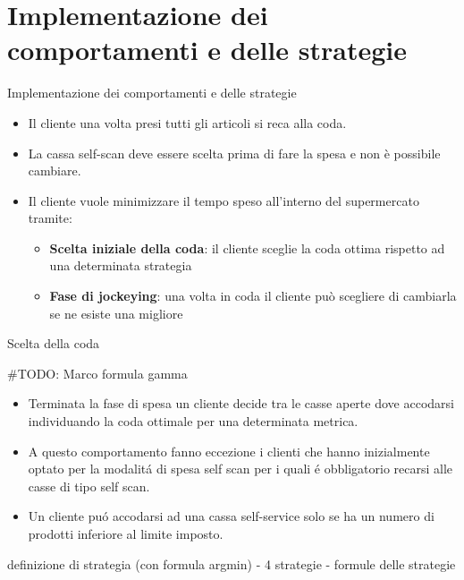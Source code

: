 \section{Implementazione dei comportamenti e delle strategie}





\begin{frame}{Implementazione dei comportamenti e delle strategie}
	\begin{itemize}
		\item Il cliente una volta presi tutti gli articoli si reca alla coda.
		\item La cassa self-scan deve essere scelta prima di fare la spesa e non è possibile cambiare.
		\item Il cliente vuole minimizzare il tempo speso all'interno del supermercato tramite:
		\begin{itemize}
			\item \textbf{Scelta iniziale della coda}: il cliente sceglie la coda ottima rispetto ad una determinata strategia
			\item \textbf{Fase di jockeying}: una volta in coda il cliente può scegliere di cambiarla se ne esiste una migliore
		\end{itemize}
	\end{itemize}
\end{frame}


\begin{frame}{Scelta della coda}
  \centering

  \#TODO: Marco formula gamma

  \begin{itemize}
  \item Terminata la fase di spesa un cliente decide tra le casse
    aperte dove accodarsi individuando la coda ottimale per una
    determinata metrica.

  \item A questo comportamento fanno eccezione i clienti che hanno
    inizialmente optato per la modalitá di spesa self scan per i quali
    é obbligatorio recarsi alle casse di tipo self scan.

  \item Un cliente puó accodarsi ad una cassa self-service solo se ha
    un numero di prodotti inferiore al limite imposto.
  \end{itemize}
  
  definizione di strategia (con formula argmin) - 4 strategie -
  formule delle strategie
\end{frame}


